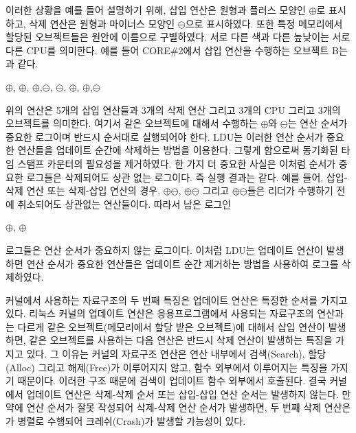 이러한 상황을 예를 들어 설명하기 위해, 삽입 연산은 원형과 플러스 모양인 $\oplus$로 표시하고, 
삭제 연산은 원형과 마이너스 모양인 $\ominus$으로 표시하였다.
또한 특정 메모리에서 할당된 오브젝트들은 원안에 이름으로 구별하였다.
서로 다른 색과 다른 높낮이는 서로 다른 CPU를 의미한다. 
예를 들어 CORE\#2에서 삽입 연산을 수행하는 오브젝트 B는 과 같다.

\begin{center}
$\oplus$, $\oplus$, $\oplus$,$\ominus$,
$\ominus$, $\oplus$, $\oplus$,$\ominus$
\end{center}

위의 연산은 5개의 삽입 연산들과 3개의 삭제 연산 그리고 3개의 CPU 그리고 3개의 오브젝트를 의미한다.
여기서 같은 오브젝트에 대해서 수행하는 $\oplus$와 $\ominus$는 
연산 순서가 중요한 로그이며 반드시 순서대로 실행되어야 한다.  
LDU는 이러한 연산 순서가 중요한 연산들을 업데이트 순간에 삭제하는 방법을 이용한다.
그렇게 함으로써 동기화된 타임 스탬프 카운터의 필요성을 제거하였다. 
한 가지 더 중요한 사실은 이처럼 순서가 중요한 로그들은 삭제되어도 상관 없는 로그이다. 
즉 실행 결과는 같다.
예를 들어, 삽입-삭제 연산 또는 삭제-삽입 연산의 경우,
$\oplus$$\ominus$, $\oplus$$\ominus$ 
그리고 $\oplus$$\ominus$들은 리더가 수행하기 전에 취소되어도 상관없는 연산들이다. 
따라서 남은 로그인
\begin{center}
 $\oplus$, $\oplus$
\end{center}
로그들은 연산 순서가 중요하지 않는 로그이다.
이처럼 LDU는 업데이트 연산이 발생하면 연산 순서가 중요한 연산들은 업데이트 순간 제거하는 방법을 
사용하여 로그를 삭제하였다.

커널에서 사용하는 자료구조의 두 번째 특징은 업데이트 연산은 특정한 순서를 가지고 있다.
리눅스 커널의 업데이트 연산은 응용프로그램에서 사용되는 자료구조의 연산과는 다르게 
같은 오브젝트(메모리에서 할당 받은 오브젝트)에 대해서 삽입 연산이 발생하면, 
같은 오브젝트를 사용하는 다음 연산은 반드시 삭제 연산이 발생하는 특징을 가지고 있다.
그 이유는 커널의 자료구조 연산은 연산 내부에서 검색(Search), 할당(Alloc) 그리고 해제(Free)가 이루어지지 않고, 
함수 외부에서 이루어지는 특징을 가지기 때문이다. 
이러한 구조 때문에 검색이 업데이트 함수 외부에서 호출된다. 
결국 커널에서 업데이트 연산은 삭제-삭제 순서 또는 삽입-삽입 연산 순서는 발생하지 않는다. 
만약에 연산 순서가 잘못 작성되어 삭제-삭제 연산 순서가 발생하면, 두 번째 삭제 연산은 
가 병렬로 수행되어 크레쉬(Crash)가 발생할 가능성이 있다. 

